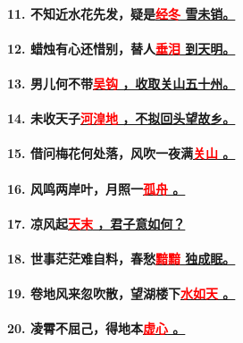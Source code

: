 \documentclass[UTF8]{ctexart} %
\begin{document}
\paragraph{11. 不知近水花先发，疑是\uline{\quad \textcolor{red}{经}\textcolor{red}{冬} \quad 雪未销。}}
\paragraph{12. 蜡烛有心还惜别，替人\uline{\quad \textcolor{red}{垂}\textcolor{red}{泪} \quad 到天明。}}
\paragraph{13. 男儿何不带\uline{\quad \textcolor{red}{吴}\textcolor{red}{钩} \quad ，收取关山五十州。}}
\paragraph{14. 未收天子\uline{\quad \textcolor{red}{河}\textcolor{red}{湟}\textcolor{red}{地} \quad ，不拟回头望故乡。}}
\paragraph{15. 借问梅花何处落，风吹一夜满\uline{\quad \textcolor{red}{关}\textcolor{red}{山} \quad 。}}
\paragraph{16. 风鸣两岸叶，月照一\uline{\quad \textcolor{red}{孤}\textcolor{red}{舟} \quad  。}}
\paragraph{17. 凉风起\uline{\quad \textcolor{red}{天}\textcolor{red}{末} \quad ，君子意如何？}}
\paragraph{18. 世事茫茫难自料，春愁\uline{\quad \textcolor{red}{黯}\textcolor{red}{黯} \quad 独成眠。}}
\paragraph{19. 卷地风来忽吹散，望湖楼下\uline{\quad \textcolor{red}{水}\textcolor{red}{如}\textcolor{red}{天} \quad  。}}
\paragraph{20. 凌霄不屈己，得地本\uline{\quad \textcolor{red}{虚}\textcolor{red}{心} \quad。}}
\end{document}
